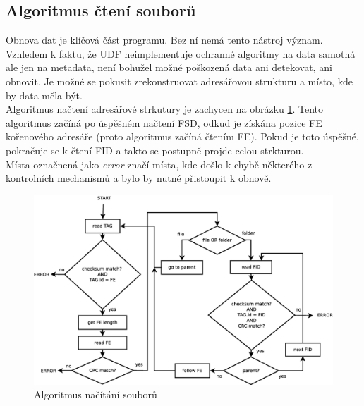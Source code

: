 \subsection{Algoritmus čtení souborů}
Obnova dat je klíčová část programu. Bez ní nemá tento nástroj význam. Vzhledem k faktu, že UDF neimplementuje ochranné algoritmy na data samotná ale jen na metadata, není bohužel možné poškozená data ani detekovat, ani obnovit. Je možné se pokusit zrekonstruovat adresářovou strukturu a místo, kde by data měla být.\\
Algoritmus načtení adresářové strkutury je zachycen na obrázku \ref{fig:files}. Tento algoritmus začíná po úspěšném načtení FSD, odkud je získána pozice FE kořenového adresáře (proto algoritmus začíná čtením FE). Pokud je toto úspěšné, pokračuje se k čtení FID a takto se postupně projde celou strkturou.\\
Místa označnená jako \textit{error} značí místa, kde došlo k chybě některého z kontrolních mechanismů a bylo by nutné přistoupit k obnově. 
\begin{figure}[ht] 
    \centering
    \includegraphics[scale=0.36]{obrazky/files.eps}
    \caption{Algoritmus načítání souborů}
    \label{fig:files}
\end{figure}

